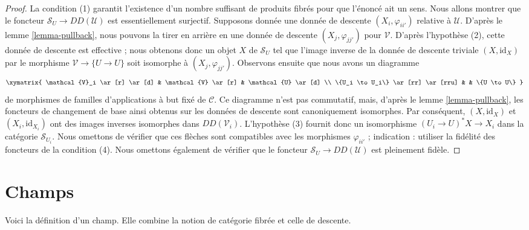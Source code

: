 \begin{proof}
La condition (1) garantit l'existence d'un nombre suffisant de produits fibrés
pour que l'énoncé ait un sens. Nous allons montrer que le foncteur
$\mathcal{S}_U \to DD(\mathcal{U})$ est essentiellement surjectif.
Supposons donnée une donnée de descente $(X_i, \varphi_{ii'})$ relative à
$\mathcal{U}$. D'après le lemme \ref{lemma-pullback}, nous pouvons la tirer en
arrière en une donnée de descente $(X_j, \varphi_{jj'})$ pour $\mathcal{V}$.
D'après l'hypothèse (2), cette donnée de descente est effective ; nous obtenons
donc un objet $X$ de $\mathcal{S}_U$ tel que l'image inverse de la donnée de
descente triviale $(X, \text{id}_X)$ par le morphisme
$\mathcal{V} \to \{U \to U\}$ soit isomorphe à
$(X_j, \varphi_{jj'})$. Observons ensuite que nous avons un diagramme
$$
\xymatrix{
\mathcal{V}_i \ar[r] \ar[d] &
\mathcal{V} \ar[r] &
\mathcal{U} \ar[d] \\
\{U_i \to U_i\} \ar[rr] \ar[rru] & &
\{U \to U\}
}
$$
de morphismes de familles d'applications à but fixé de $\mathcal{C}$.
Ce diagramme n'est pas commutatif, mais, d'après le
lemme \ref{lemma-pullback}, les foncteurs de changement de base ainsi obtenus
sur les données de descente sont canoniquement isomorphes. Par conséquent,
$(X, \text{id}_X)$ et $(X_i, \text{id}_{X_i})$ ont des images inverses
isomorphes dans $DD(\mathcal{V}_i)$. L'hypothèse (3) fournit donc un
isomorphisme $(U_i \to U)^*X \to X_i$ dans la catégorie
$\mathcal{S}_{U_i}$. Nous omettons de vérifier que ces flèches sont compatibles
avec les morphismes $\varphi_{ii'}$ ; indication : utiliser la fidélité des
foncteurs de la condition (4). Nous omettons également de vérifier que le
foncteur $\mathcal{S}_U \to DD(\mathcal{U})$ est pleinement fidèle.
\end{proof}











\section{Champs}
\label{section-definition}

\noindent
Voici la définition d'un champ. Elle combine la notion de catégorie
fibrée et celle de descente.

